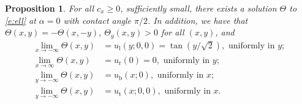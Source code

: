 \documentclass[10pt]{article}
\newtheorem{Proposition}[Lemma]{Proposition}
\renewcommand{\geq}{\geqslant}
\begin{document}
\begin{Proposition}\label{p:0}
For all $c_x\geq 0$, sufficiently small, there exists a solution $\Theta$ to \eqref{e:ell} at $\alpha=0$ with contact angle $\pi/2$. In addition, we have that $\Theta(x,y)=-\Theta(x,-y)$, $\Theta_y(x,y)>0$ for all $(x,y)$, and 
\begin{align*}
\lim_{x\to -\infty}\Theta(x,y)&=u_\mathrm{l}(y;0,0)=\tan(y/\sqrt{2}), \mbox{ uniformly in }y;\\
\lim_{x\to \infty}\Theta(x,y)&=u_\mathrm{r}(0)=0, \mbox{ uniformly in }y;\\
\lim_{y\to -\infty}\Theta(x,y)&=u_\mathrm{b}(x;0), \mbox{ uniformly in }x;\\
\lim_{y\to -\infty}\Theta(x,y)&=u_\mathrm{t}(x;0,0), \mbox{ uniformly in }x.
\end{align*}
\end{Proposition}
\end{document}
